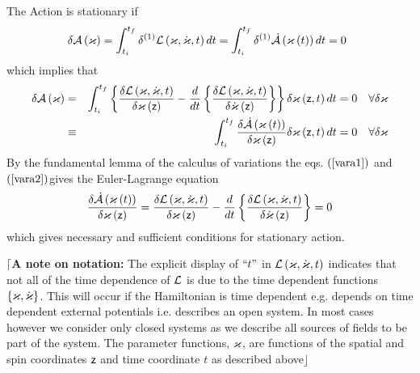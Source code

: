 The Action is stationary if 
\begin{equation}
\delta {\cal A}\left( \varkappa \right) =\int_{t_{i}}^{t_{f}}\delta ^{\left(
1\right) }{\cal L}\left( \varkappa ,\dot{\varkappa},t\right)
dt=\int_{t_{i}}^{t_{f}}\delta ^{\left( 1\right) }{\cal \dot{A}}\left(
\varkappa \left( t\right) \right) dt=0\,\text{ }
\end{equation}%
which implies that 
\begin{eqnarray}
\delta {\cal A}\left( \varkappa \right) &=&\int_{t_{i}}^{t_{f}}\left\{ \frac{%
\delta {\cal L}\left( {\cal \varkappa },{\cal \dot{\varkappa}},t\right) }{%
\delta {\cal \varkappa }\left( {\sf z}\right) }-\frac{d}{dt}\left\{ \frac{%
\delta {\cal L}\left( {\cal \varkappa },{\cal \dot{\varkappa}},t\right) }{%
\delta {\cal \dot{\varkappa}}\left( {\sf z}\right) }\right\} \right\} \delta
\varkappa \left( {\sf z},t\right) dt=0\quad \forall \delta \varkappa
\label{vara1} \\
&\equiv &\int_{t_{i}}^{t_{f}}\frac{\delta {\cal \dot{A}}\left( \varkappa
\left( t\right) \right) }{\delta {\cal \varkappa }\left( {\sf z}\right) }%
\delta \varkappa \left( {\sf z},t\right) dt=0\quad \forall \delta \varkappa
\label{vara2}
\end{eqnarray}%
By the fundamental lemma of the calculus of variations the eqs. $\left( \ref%
{vara1}\right) $ and $\left( \ref{vara2}\right) $gives the Euler-Lagrange
equation%
\begin{equation}
\frac{\delta {\cal \dot{A}}\left( \varkappa \left( t\right) \right) }{\delta 
{\cal \varkappa }\left( {\sf z}\right) }=\frac{\delta {\cal L}\left( {\cal %
\varkappa },{\cal \dot{\varkappa}},t\right) }{\delta {\cal \varkappa }\left( 
{\sf z}\right) }-\frac{d}{dt}\left\{ \frac{\delta {\cal L}\left( {\cal %
\varkappa },{\cal \dot{\varkappa}},t\right) }{\delta {\cal \dot{\varkappa}}%
\left( {\sf z}\right) }\right\} =0
\end{equation}%
which gives necessary and sufficient conditions for stationary action.

$\lceil ${\bf A note on notation: }The explicit display of $``t"$ in ${\cal L%
}\left( {\cal \varkappa },{\cal \dot{\varkappa}},t\right) $ indicates that
not all of the time dependence of ${\cal L}$ is due to the time dependent
functions $\left\{ {\cal \varkappa },{\cal \dot{\varkappa}}\right\} $. This
will occur if the Hamiltonian is time dependent e.g. depends on time
dependent external potentials i.e. describes an open system. In most cases
however we consider only closed systems as we describe all sources of fields
to be part of the system. The parameter functions, ${\cal \varkappa }$, are
functions of the spatial and spin coordinates ${\sf z}$ and time coordinate $%
t$ as described above$\rfloor $

